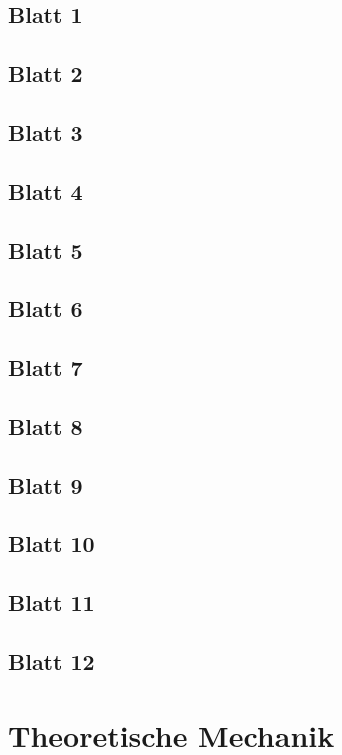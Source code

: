 \documentclass{tuftebook}
\numberwithin{Theorem}{chapter}
\theoremstyle{definition}
\theoremstyle{definition}
\begin{document}
\section{Blatt 1}

\section{Blatt 2}

\section{Blatt 3}

\section{Blatt 4}

\section{Blatt 5}

\section{Blatt 6}

\section{Blatt 7}

\section{Blatt 8}

\section{Blatt 9}

\section{Blatt 10}

\section{Blatt 11}

\section{Blatt 12}


\chapter{Theoretische Mechanik}
\end{document}
